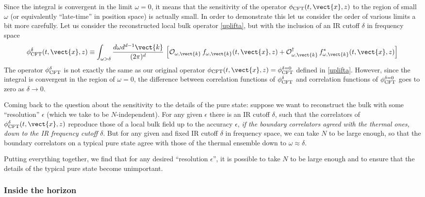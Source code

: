 Since the integral is convergent in the limit $\omega=0$, it means that the sensitivity of the operator $\phi_{\rm CFT}(t,\vect{x},z)$ to the region of small $\omega$ (or equivalently ``late-time'' in position space) is actually small. In order to demonstrate this let us consider the order of various limits a bit more carefully. Let us consider the reconstructed local bulk operator \eqref{uplifta}, but with the inclusion of an IR cutoff $\delta$ in frequency space
\[
\phi_{\rm CFT}^{\delta}(t,\vect{x},z) \equiv \int_{\omega>\delta}{d\omega d^{d-1}\vect{k} \over (2\pi)^d}\, \left[{\cal O}_{\omega,\vect{k}} \, f_{\omega,\vect{k}}(t,\vect{x},z) + {\cal O}_{\omega,\vect{k}}^\dagger \, f_{\omega,\vect{k}}^*(t,\vect{x},z)\right]
\]
The operator $\phi_{\rm CFT}^{\delta}$ is not exactly the same as our original operator $\phi_{\rm CFT}(t,\vect{x},z) =\phi^{\delta=0}_{\rm CFT}$ defined in \eqref{uplifta}. However, since the integral is convergent in the region of $\omega=0$, the difference between correlation functions of $\phi^\delta_{\rm CFT}$ and correlation functions of $\phi^{\delta=0}_{\rm CFT}$ goes to zero as $\delta\rightarrow 0$.

Coming back to the question about the sensitivity to the details of the pure state: suppose we want to reconstruct the bulk with some  ``resolution'' $\epsilon$ (which we take to be $N$-independent). For any given $\epsilon$ there is an IR cutoff $\delta$, such that the correlators of $\phi_{\rm CFT}^\delta(t,\vect{x},z)$ reproduce those of a local bulk field up to the accuracy $\epsilon$, {\it if the boundary correlators agreed with the thermal ones, down to the IR frequency cutoff $\delta$}. But for any given and fixed IR cutoff $\delta$ in frequency space, we can take $N$ to be large enough, so that the boundary correlators on a typical pure state agree with those of the thermal ensemble down to $\omega \approx \delta$.

Putting everything together, we find that for any desired ``resolution $\epsilon$'', it is possible to take $N$ to be large enough and to ensure that the details of the typical pure state become unimportant.


\subsubsection{Inside the horizon}

